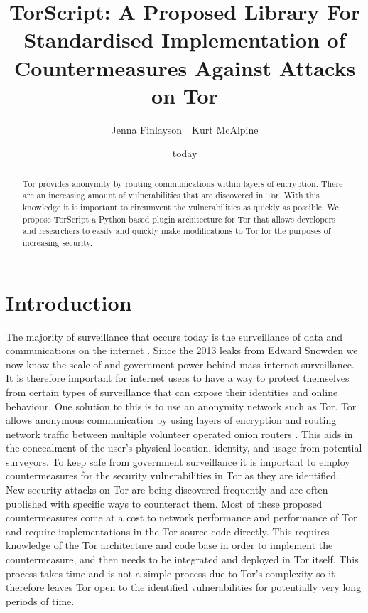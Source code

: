 \documentclass[9pt,technote]{IEEEtran}
\title{TorScript: A Proposed Library For Standardised Implementation of Countermeasures Against Attacks on Tor}
\date{today}
\author{Jenna Finlayson~~Kurt McAlpine}
\begin{document}
 
\maketitle

\begin{abstract}
Tor provides anonymity by routing communications within layers of encryption.
There are an increasing amount of vulnerabilities that are discovered in Tor.
With this knowledge it is important to circumvent the vulnerabilities as quickly
as possible. We propose TorScript a Python based plugin architecture for Tor
that allows developers and researchers to easily and quickly make modifications
to Tor for the purposes of increasing security.
\end{abstract}

\section{Introduction} 
The majority of surveillance that occurs today is the surveillance of data and communications on the internet \cite{diffie2008brave}. Since the 2013 leaks from Edward Snowden we now know the scale of and government power behind mass internet surveillance. It is therefore important for internet users to have a way to protect themselves from certain types of surveillance that can expose their identities and online behaviour. One solution to this is to use an anonymity network such as Tor. Tor allows anonymous communication by using layers of encryption and routing network traffic between multiple volunteer operated onion routers \cite{tor}. This aids in the concealment of the
user's physical location, identity, and usage from potential surveyors. To keep
safe from government surveillance it is important to employ countermeasures for the security vulnerabilities in Tor as they are identified.\\

New security attacks on Tor are being discovered frequently and are often published with specific ways to counteract them. Most of these proposed countermeasures come at a cost to network performance and performance of Tor and require implementations in the Tor source code directly. This requires knowledge of the Tor architecture and code base in order to implement the countermeasure, and then needs to be integrated and deployed in Tor itself. This process takes time and is not a simple process due to Tor's complexity so it therefore leaves Tor open to the identified vulnerabilities for potentially very long periods of time. \\
\end{document}
